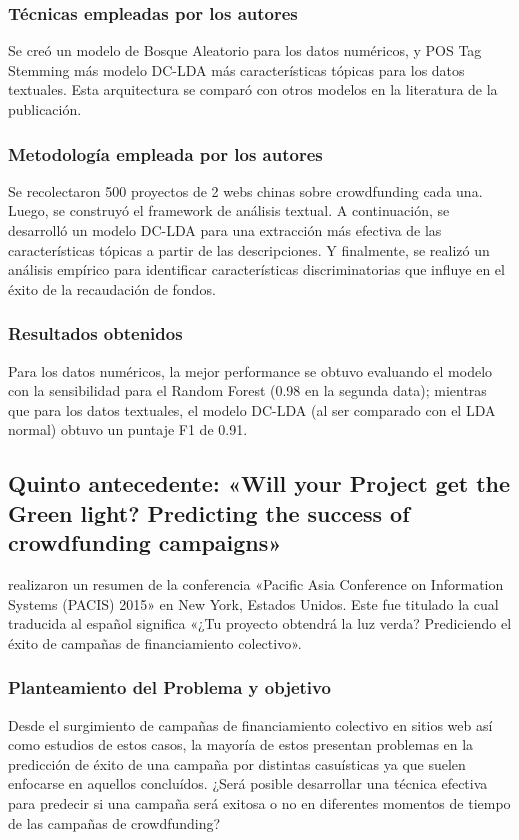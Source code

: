 \subsubsection{Técnicas empleadas por los autores}
Se creó un modelo de Bosque Aleatorio para los datos numéricos, y POS Tag Stemming más modelo DC-LDA más características tópicas para los datos textuales. Esta arquitectura se comparó con otros modelos en la literatura de la publicación.

\subsubsection{Metodología empleada por los autores}
Se recolectaron 500 proyectos de 2 webs chinas sobre crowdfunding cada una. Luego, se construyó el framework de análisis textual. A continuación, se desarrolló un modelo DC-LDA para una extracción más efectiva de las características tópicas a partir de las descripciones. Y finalmente, se realizó un análisis empírico para identificar características discriminatorias que influye en el éxito de la recaudación de fondos.

\subsubsection{Resultados obtenidos}
Para los datos numéricos, la mejor performance se obtuvo evaluando el modelo con la sensibilidad para el Random Forest (0.98 en la segunda data); mientras que para los datos textuales, el modelo DC-LDA (al ser comparado con el LDA normal) obtuvo un puntaje F1 de 0.91.


\subsection{Quinto antecedente: «Will your Project get the Green light? Predicting the success of crowdfunding campaigns» \citep*{pr_chen2015predcrowd}}
\citeauthor{pr_chen2015predcrowd} realizaron un resumen de la conferencia «Pacific Asia Conference on Information Systems (PACIS) 2015» en New York, Estados Unidos. Este fue titulado  la cual traducida al español significa «¿Tu proyecto obtendrá la luz verda? Prediciendo el éxito de campañas de financiamiento colectivo».

\subsubsection{Planteamiento del Problema y objetivo}
Desde el surgimiento de campañas de financiamiento colectivo en sitios web así como estudios de estos casos, la mayoría de estos presentan problemas en la predicción de éxito de una campaña por distintas casuísticas ya que suelen enfocarse en aquellos concluídos. ¿Será posible desarrollar una técnica efectiva para predecir si una campaña será exitosa o no en diferentes momentos de tiempo de las campañas de crowdfunding?

